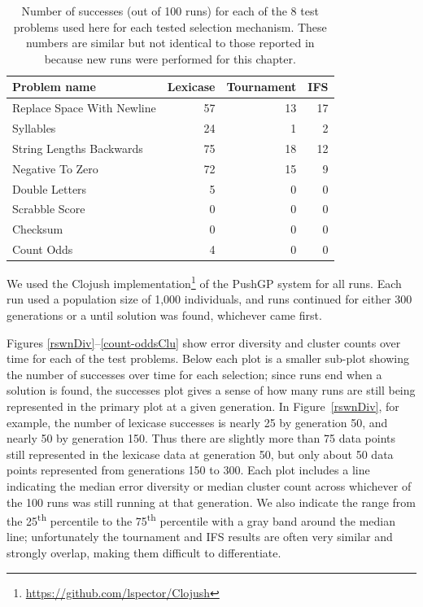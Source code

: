 \begin{table}
\centering
	\caption{Number of successes (out of 100 runs) for each of the 8 test problems used here for each
		tested selection mechanism. These numbers are similar but not identical to those reported in 
		\cite{Helmuth:2015:GECCO} because new runs were performed for this chapter.}
	\label{tab:successCounts}
	\begin{tabular}{lrrr}
		Problem name \quad & Lexicase \quad & Tournament \quad & IFS \\
		\hline
		Replace Space With Newline & 57 & 13 & 17 \\ %
		Syllables & 24 & 1 & 2 \\ %
		String Lengths Backwards & 75 & 18 & 12 \\
		Negative To Zero & 72 & 15 & 9 \\
		Double Letters & 5 & 0 & 0 \\
		Scrabble Score & 0 & 0 & 0 \\
		Checksum & 0 & 0 & 0 \\
		Count Odds & 4 & 0 & 0 \\
	\end{tabular}
\end{table}

We used the Clojush implementation\footnote{\url{https://github.com/lspector/Clojush}} 
of the PushGP system \citep{spector:2002:GPEM, 1068292} for all runs. Each run used a population size of 1,000 
individuals, and runs continued for either 300 generations or a until solution was found, whichever 
came first. 

Figures \ref{rswnDiv}--\ref{count-oddsClu} show error diversity and cluster counts over time for each of
the test problems. Below each plot is a smaller sub-plot showing the number of successes 
over time for each selection; since runs end when a solution is found, the successes plot gives a
sense of how many runs are still being represented in the primary plot at a given generation.
In Figure~\ref{rswnDiv}, for example, the number of lexicase successes is nearly 25 by generation
50, and nearly 50 by generation 150. Thus there are slightly more than 75 data points still represented
in the lexicase data at generation 50, but only about 50 data points represented from generations 150
to 300. Each plot includes a line indicating the median error diversity or median cluster count across
whichever of the 100 runs was still running at that generation. We also indicate the 
range from the 25\textsuperscript{th} percentile to the 75\textsuperscript{th} percentile with a gray band around the median line; 
unfortunately the tournament and IFS results are often very similar and strongly overlap, making them difficult to differentiate.

